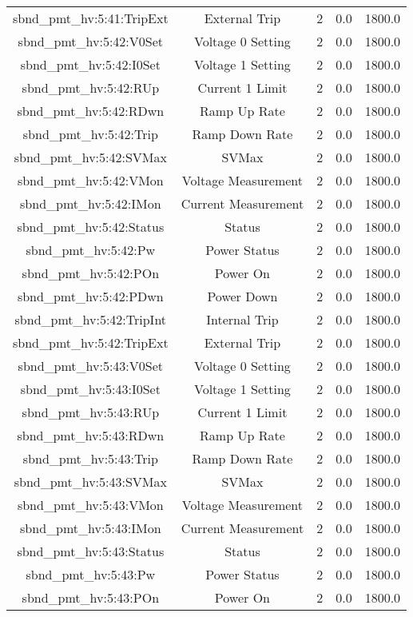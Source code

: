 \begin{center}
\begin{longtable}{c | c c c c }
sbnd\_pmt\_hv:5:41:TripExt & External Trip & 2 & 0.0 & 1800.0\\ 
sbnd\_pmt\_hv:5:42:V0Set & Voltage 0 Setting & 2 & 0.0 & 1800.0\\ 
sbnd\_pmt\_hv:5:42:I0Set & Voltage 1 Setting & 2 & 0.0 & 1800.0\\ 
sbnd\_pmt\_hv:5:42:RUp & Current 1 Limit & 2 & 0.0 & 1800.0\\ 
sbnd\_pmt\_hv:5:42:RDwn & Ramp Up Rate & 2 & 0.0 & 1800.0\\ 
sbnd\_pmt\_hv:5:42:Trip & Ramp Down Rate & 2 & 0.0 & 1800.0\\ 
sbnd\_pmt\_hv:5:42:SVMax & SVMax & 2 & 0.0 & 1800.0\\ 
sbnd\_pmt\_hv:5:42:VMon & Voltage Measurement & 2 & 0.0 & 1800.0\\ 
sbnd\_pmt\_hv:5:42:IMon & Current Measurement & 2 & 0.0 & 1800.0\\ 
sbnd\_pmt\_hv:5:42:Status & Status & 2 & 0.0 & 1800.0\\ 
sbnd\_pmt\_hv:5:42:Pw & Power Status & 2 & 0.0 & 1800.0\\ 
sbnd\_pmt\_hv:5:42:POn & Power On & 2 & 0.0 & 1800.0\\ 
sbnd\_pmt\_hv:5:42:PDwn & Power Down & 2 & 0.0 & 1800.0\\ 
sbnd\_pmt\_hv:5:42:TripInt & Internal Trip & 2 & 0.0 & 1800.0\\ 
sbnd\_pmt\_hv:5:42:TripExt & External Trip & 2 & 0.0 & 1800.0\\ 
sbnd\_pmt\_hv:5:43:V0Set & Voltage 0 Setting & 2 & 0.0 & 1800.0\\ 
sbnd\_pmt\_hv:5:43:I0Set & Voltage 1 Setting & 2 & 0.0 & 1800.0\\ 
sbnd\_pmt\_hv:5:43:RUp & Current 1 Limit & 2 & 0.0 & 1800.0\\ 
sbnd\_pmt\_hv:5:43:RDwn & Ramp Up Rate & 2 & 0.0 & 1800.0\\ 
sbnd\_pmt\_hv:5:43:Trip & Ramp Down Rate & 2 & 0.0 & 1800.0\\ 
sbnd\_pmt\_hv:5:43:SVMax & SVMax & 2 & 0.0 & 1800.0\\ 
sbnd\_pmt\_hv:5:43:VMon & Voltage Measurement & 2 & 0.0 & 1800.0\\ 
sbnd\_pmt\_hv:5:43:IMon & Current Measurement & 2 & 0.0 & 1800.0\\ 
sbnd\_pmt\_hv:5:43:Status & Status & 2 & 0.0 & 1800.0\\ 
sbnd\_pmt\_hv:5:43:Pw & Power Status & 2 & 0.0 & 1800.0\\ 
sbnd\_pmt\_hv:5:43:POn & Power On & 2 & 0.0 & 1800.0\\ 

\end{longtable}
\end{center}
